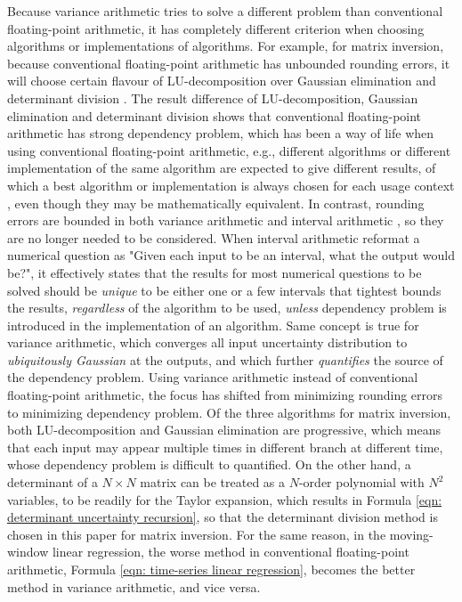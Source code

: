 \documentclass[twoside]{article}
\numberwithin{equation}{section}
\begin{document}
Because variance arithmetic tries to solve a different problem than conventional floating-point arithmetic, it has completely different criterion when choosing algorithms or implementations of algorithms.  For example, for matrix inversion, because conventional floating-point arithmetic has unbounded rounding errors, it will choose certain flavour of LU-decomposition over Gaussian elimination and determinant division \cite{Numerical_Recipes}. The result difference of LU-decomposition, Gaussian elimination and determinant division shows that conventional floating-point arithmetic has strong dependency problem, which has been a way of life when using conventional floating-point arithmetic, e.g., different algorithms or different implementation of the same algorithm are expected to give different results, of which a best algorithm or implementation is always chosen for each usage context \cite{Numerical_Recipes}, even though they may be mathematically equivalent. In contrast, rounding errors are bounded in both variance arithmetic and interval arithmetic \cite{Worst_Case_Error_Bounds}, so they are no longer needed to be considered.  When interval arithmetic reformat a numerical question as "Given each input to be an interval, what the output would be?", it effectively states that the results for most numerical questions to be solved should be \emph{unique} to be either one or a few intervals that tightest bounds the results, \emph{regardless} of the algorithm to be used, \emph{unless} dependency problem is introduced in the implementation of an algorithm.  Same concept is true for variance arithmetic, which converges all input uncertainty distribution to \emph{ubiquitously Gaussian} at the outputs, and which further \emph{quantifies} the source of the dependency problem.  Using variance arithmetic instead of conventional floating-point arithmetic, the focus has shifted from minimizing rounding errors to minimizing dependency problem.  Of the three algorithms for matrix inversion, both LU-decomposition and Gaussian elimination are progressive, which means that each input may appear multiple times in different branch at different time, whose dependency problem is difficult to quantified.  On the other hand, a determinant of a $N \times N$ matrix can be treated as a $N$-order polynomial with $N^2$ variables, to be readily for the Taylor expansion, which results in Formula \eqref{eqn: determinant uncertainty recursion}, so that the determinant division method is chosen in this paper for matrix inversion.  For the same reason, in the moving-window linear regression, the worse method in conventional floating-point arithmetic, Formula \eqref{eqn: time-series linear regression}, becomes the better method in variance arithmetic, and vice versa.  
\end{document}
